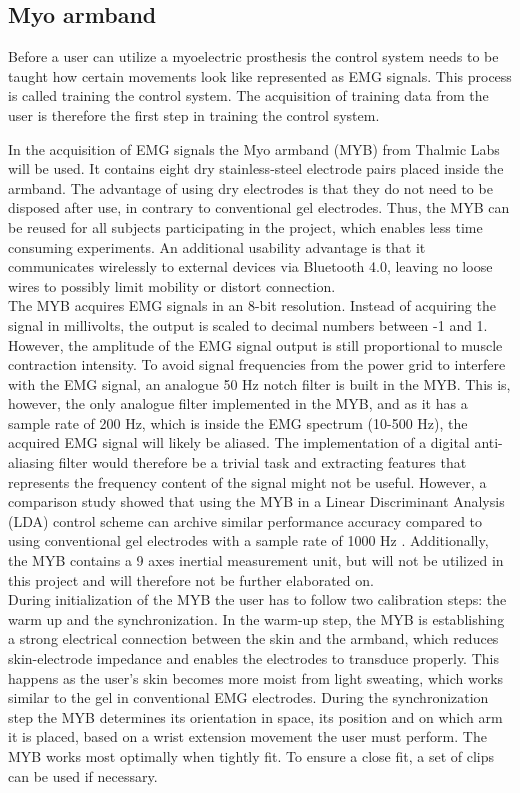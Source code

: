 \subsection{Myo armband} \label{sec:MYO}
Before a user can utilize a myoelectric prosthesis the control system needs to be taught how certain movements look like represented as EMG signals. This process is called training the control system. The acquisition of training data from the user is therefore the first step in training the control system.

In the acquisition of EMG signals the Myo armband (MYB) from Thalmic Labs will be used. It contains eight dry stainless-steel electrode pairs placed inside the armband. The advantage of using dry electrodes is that they do not need to be disposed after use, in contrary to conventional gel electrodes. Thus, the MYB can be reused for all subjects participating in the project, which enables less time consuming experiments. An additional usability advantage is that it communicates wirelessly to external devices via Bluetooth 4.0, leaving no loose wires to possibly limit mobility or distort connection. \\ 
The MYB acquires EMG signals in an 8-bit resolution. Instead of acquiring the signal in millivolts, the output is scaled to decimal numbers between -1 and 1. However, the amplitude of the EMG signal output is still proportional to muscle contraction intensity. To avoid signal frequencies from the power grid to interfere with the EMG signal, an analogue 50 Hz notch filter is built in the MYB. This is, however, the only analogue filter implemented in the MYB, and as it has a sample rate of 200 Hz, which is inside the EMG spectrum (10-500 Hz), the acquired EMG signal will likely be aliased. The implementation of a digital anti-aliasing filter would therefore be a trivial task and extracting features that represents the frequency content of the signal might not be useful. However, a comparison study showed that using the MYB in a Linear Discriminant Analysis (LDA) control scheme can archive similar performance accuracy compared to using conventional gel electrodes with a sample rate of 1000 Hz \cite{Mendez2017}. Additionally, the MYB contains a 9 axes inertial measurement unit, but will not be utilized in this project and will therefore not be further elaborated on. \\
During initialization of the MYB the user has to follow two calibration steps: the warm up and the synchronization. In the warm-up step, the MYB is establishing a strong electrical connection between the skin and the armband, which reduces skin-electrode impedance and enables the electrodes to transduce properly. This happens as the user's skin becomes more moist from light sweating, which works similar to the gel in conventional EMG electrodes. During the synchronization step the MYB determines its orientation in space, its position and on which arm it is placed, based on a wrist extension movement the user must perform. 
The MYB works most optimally when tightly fit. To ensure a close fit, a set of clips can be used if necessary. 

